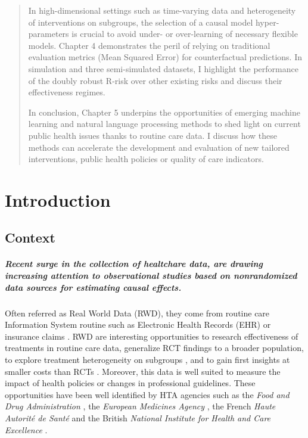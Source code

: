 \documentclass{report}
\begin{document}
\begin{abstract}
  In high-dimensional settings such as time-varying data and heterogeneity of
  interventions on subgroups, the selection of a causal model hyper-parameters
  is crucial to avoid under- or over-learning of necessary flexible models.
  Chapter 4 demonstrates the peril of relying on traditional evaluation metrics
  (Mean Squared Error) for counterfactual predictions. In simulation and three
  semi-simulated datasets, I highlight the performance of the doubly robust
  R-risk over other existing risks and discuss their effectiveness regimes.

  In conclusion, Chapter 5 underpins the opportunities of emerging machine
  learning and natural language processing methods to shed light on current
  public health issues thanks to routine care data. I discuss how these methods
  can accelerate the development and evaluation of new tailored interventions,
  public health policies or quality of care indicators.

\end{abstract}




\chapter{Introduction}

\section{Context}

\paragraph{Recent surge in the collection of healtchare data, are drawing
  increasing attention to observational studies based on nonrandomized data
  sources for estimating causal effects.} Often referred as Real World Data
(RWD), they come from routine care Information System routine such as
Electronic Health Records (EHR) or insurance claims \citep{wang2023emulation}.
RWD are interesting opportunities to research effectiveness of treatments in
routine care data, generalize RCT findings to a broader population, to explore
treatment heterogeneity on subgroups \citep{mant1999can, desai2021broadening},
and to gain first insights at smaller costs than RCTs
\citep{black1996we,bosdriesz2020evidence}. Moreover, this data is well suited
to measure the impact of health policies or changes in professional
guidelines. These opportunities have been well identified by HTA agencies such
as the \textit{Food and Drug Administration}
\citep{desai2021broadening,fda_real-world_2021}, the \textit{European
  Medicines Agency} \citep{flynn_marketing_2022}, the French \textit{Haute
  Autorité de Santé} \citep{vanier2023rapid} and the British \textit{National
  Institute for
  Health and Care Excellence} \citep{kent_nice_2022}.
\end{document}

